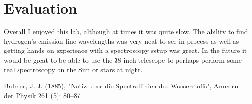 \documentclass{article}
\begin{document}

\section{Evaluation}

Overall I enjoyed this lab, although at times it was quite slow. The ability to find
hydrogen's emission line wavelengths was very neat to see in process as well as
getting hands on experience with a spectroscopy setup was great. In the future it
would be great to be able to use the 38 inch telescope to perhaps perform some real
spectroscopy on the Sun or stars at night.\\


\begin{thebibliography}{9}

Balmer, J. J. (1885), "Notiz uber die Spectrallinien des Wasserstoffs", Annalen der 
Physik 261 (5): 80–87

\end{thebibliography}
\end{document}
